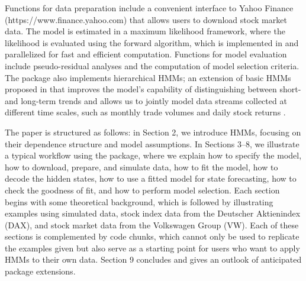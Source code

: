 \documentclass[article]{jss}
\begin{document}
Functions for data preparation include a convenient interface to Yahoo Finance (https://www.finance.yahoo.com) that allows users to download stock market data. The model is estimated in a maximum likelihood framework, where the likelihood is evaluated using the forward algorithm, which is implemented in  and parallelized for fast and efficient computation. Functions for model evaluation include pseudo-residual analyses and the computation of model selection criteria. The package also implements hierarchical HMMs; an extension of basic HMMs proposed in \cite{oel21} that improves the model's capability of distinguishing between short- and long-term trends and allows us to jointly model data streams collected at different time scales, such as monthly trade volumes and daily stock returns \citep{ada20}. 

The paper is structured as follows: in Section 2, we introduce HMMs, focusing on their dependence structure and model assumptions. In Sections 3--8, we illustrate a typical workflow using the  package, where we explain how to specify the model, how to download, prepare, and simulate data, how to fit the model, how to decode the hidden states, how to use a fitted model for state forecasting, how to check the goodness of fit, and how to perform model selection. Each section begins with some theoretical background, which is followed by illustrating examples using simulated data, stock index data from the Deutscher Aktienindex (DAX), and stock market data from the Volkswagen Group (VW). Each of these sections is complemented by code chunks, which cannot only be used to replicate the examples given but also serve as a starting point for users who want to apply HMMs to their own data. Section 9 concludes and gives an outlook of anticipated package extensions.

\end{document}
